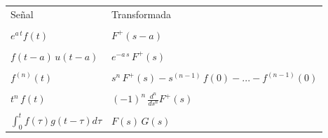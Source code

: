 \begin{center}
\begin{tabular}{ll}
Se\~{n}al                               &       Transformada                            \\
& \\
$e^{a \, t}f\left( t\right) $ & $F^{+}\left( s-a\right) $ \\ 
& \\
$f\left( t-a\right) \, u\left( t-a\right) $ & $e^{-a \, s} \, F^{+}\left( s\right) $ \\ 
& \\
$f^{\left( n\right) }\left(t\right) $ & 
$s^n \, F^{+}\left(s\right) -
s^{\left(n-1\right) } \, f\left( 0\right) -...-f^{\left( n-1\right) }\left( 0\right)$\\ 
& \\
$t^n \, f\left( t\right) $ & $\left( -1\right)^n \, \frac{d^n}{ds^n}F^{+}\left( s\right) $ \\ 
& \\
$\int_{0}^{t}f\left( \tau \right) g\left( t-\tau \right) d\tau  $ & 
$F\left( s\right) \, G\left( s\right) $
\end{tabular}
\end{center}


